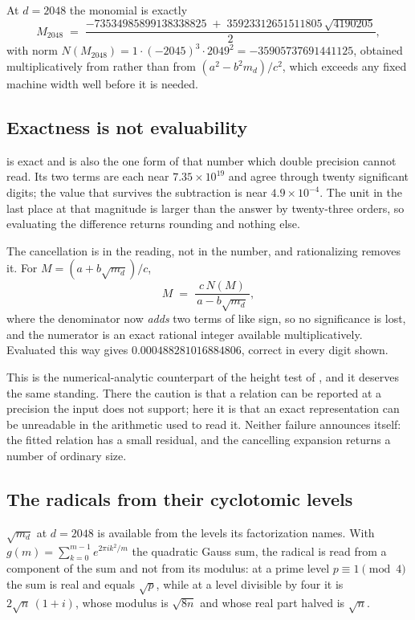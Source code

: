 \documentclass[12pt,a4paper]{article}
\newcommand{\md}{m_d}
\begin{document}
At $d=2048$ the monomial is exactly
\begin{equation}\label{eq:monomial-2048}
  M_{2048} \;=\;
  \frac{-73534985899138338825 \;+\; 35923312651511805\,\sqrt{4190205}}{2},
\end{equation}
with norm $N(M_{2048}) = 1\cdot(-2045)^3\cdot 2049^2 = -35905737691441125$,
obtained multiplicatively from  rather than from
$(a^2 - b^2\md)/c^2$, which exceeds any fixed machine width well before it is
needed.

\subsection{Exactness is not evaluability}

 is exact and is also the one form of that number which
double precision cannot read. Its two terms are each near $7.35\times10^{19}$
and agree through twenty significant digits; the value that survives the
subtraction is near $4.9\times10^{-4}$. The unit in the last place at that
magnitude is larger than the answer by twenty-three orders, so evaluating the
difference returns rounding and nothing else.

The cancellation is in the reading, not in the number, and rationalizing removes
it. For $M = (a + b\sqrt{\md})/c$,
\begin{equation}\label{eq:rationalize}
  M \;=\; \frac{c\,N(M)}{\,a - b\sqrt{\md}\,},
\end{equation}
where the denominator now \emph{adds} two terms of like sign, so no significance
is lost, and the numerator is an exact rational integer available
multiplicatively. Evaluated this way  gives
$0.000488281016884806$, correct in every digit shown.

This is the numerical-analytic counterpart of the height test of
, and it deserves the same standing. There the caution is
that a relation can be reported at a precision the input does not support; here
it is that an exact representation can be unreadable in the arithmetic used to
read it. Neither failure announces itself: the fitted relation has a small
residual, and the cancelling expansion returns a number of ordinary size.

\subsection{The radicals from their cyclotomic levels}

$\sqrt{\md}$ at $d=2048$ is available from the levels its factorization names.
With $g(m) = \sum_{k=0}^{m-1} e^{2\pi i k^2/m}$ the quadratic Gauss sum, the
radical is read from a component of the sum and not from its modulus: at a prime
level $p \equiv 1 \pmod 4$ the sum is real and equals $\sqrt{p}$, while at a
level divisible by four it is $2\sqrt{n}\,(1+i)$, whose modulus is $\sqrt{8n}$
and whose real part halved is $\sqrt{n}$.
\end{document}
